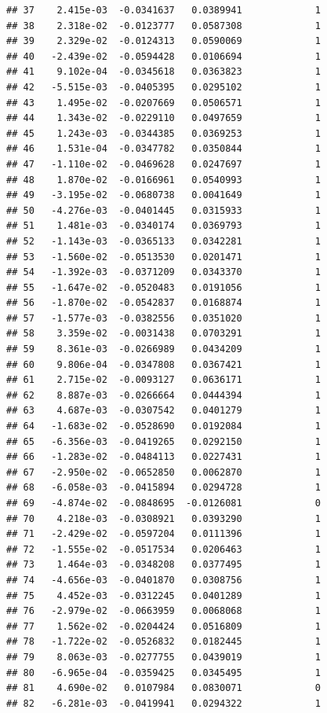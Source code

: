 \documentclass[12pt]{article}\usepackage[]{graphicx}\usepackage[]{xcolor}
\makeatletter
\newenvironment{kframe}{%
 \def\at@end@of@kframe{}%
 \ifinner\ifhmode%
  \def\at@end@of@kframe{\end{minipage}}%
  \begin{minipage}{\columnwidth}%
 \fi\fi%
 \def\FrameCommand##1{\hskip\@totalleftmargin \hskip-\fboxsep
 \colorbox{shadecolor}{##1}\hskip-\fboxsep
     \hskip-\linewidth \hskip-\@totalleftmargin \hskip\columnwidth}%
 \MakeFramed {\advance\hsize-\width
   \@totalleftmargin\z@ \linewidth\hsize
   \@setminipage}}%
 {\par\unskip\endMakeFramed%
 \at@end@of@kframe}
\newenvironment{knitrout}{}{} %
\makeatother
\begin{document}
\begin{knitrout}
\begin{kframe}
\begin{verbatim}
## 37    2.415e-03  -0.0341637   0.0389941             1
## 38    2.318e-02  -0.0123777   0.0587308             1
## 39    2.329e-02  -0.0124313   0.0590069             1
## 40   -2.439e-02  -0.0594428   0.0106694             1
## 41    9.102e-04  -0.0345618   0.0363823             1
## 42   -5.515e-03  -0.0405395   0.0295102             1
## 43    1.495e-02  -0.0207669   0.0506571             1
## 44    1.343e-02  -0.0229110   0.0497659             1
## 45    1.243e-03  -0.0344385   0.0369253             1
## 46    1.531e-04  -0.0347782   0.0350844             1
## 47   -1.110e-02  -0.0469628   0.0247697             1
## 48    1.870e-02  -0.0166961   0.0540993             1
## 49   -3.195e-02  -0.0680738   0.0041649             1
## 50   -4.276e-03  -0.0401445   0.0315933             1
## 51    1.481e-03  -0.0340174   0.0369793             1
## 52   -1.143e-03  -0.0365133   0.0342281             1
## 53   -1.560e-02  -0.0513530   0.0201471             1
## 54   -1.392e-03  -0.0371209   0.0343370             1
## 55   -1.647e-02  -0.0520483   0.0191056             1
## 56   -1.870e-02  -0.0542837   0.0168874             1
## 57   -1.577e-03  -0.0382556   0.0351020             1
## 58    3.359e-02  -0.0031438   0.0703291             1
## 59    8.361e-03  -0.0266989   0.0434209             1
## 60    9.806e-04  -0.0347808   0.0367421             1
## 61    2.715e-02  -0.0093127   0.0636171             1
## 62    8.887e-03  -0.0266664   0.0444394             1
## 63    4.687e-03  -0.0307542   0.0401279             1
## 64   -1.683e-02  -0.0528690   0.0192084             1
## 65   -6.356e-03  -0.0419265   0.0292150             1
## 66   -1.283e-02  -0.0484113   0.0227431             1
## 67   -2.950e-02  -0.0652850   0.0062870             1
## 68   -6.058e-03  -0.0415894   0.0294728             1
## 69   -4.874e-02  -0.0848695  -0.0126081             0
## 70    4.218e-03  -0.0308921   0.0393290             1
## 71   -2.429e-02  -0.0597204   0.0111396             1
## 72   -1.555e-02  -0.0517534   0.0206463             1
## 73    1.464e-03  -0.0348208   0.0377495             1
## 74   -4.656e-03  -0.0401870   0.0308756             1
## 75    4.452e-03  -0.0312245   0.0401289             1
## 76   -2.979e-02  -0.0663959   0.0068068             1
## 77    1.562e-02  -0.0204424   0.0516809             1
## 78   -1.722e-02  -0.0526832   0.0182445             1
## 79    8.063e-03  -0.0277755   0.0439019             1
## 80   -6.965e-04  -0.0359425   0.0345495             1
## 81    4.690e-02   0.0107984   0.0830071             0
## 82   -6.281e-03  -0.0419941   0.0294322             1

\end{verbatim}
\end{kframe}
\end{knitrout}
\end{document}
